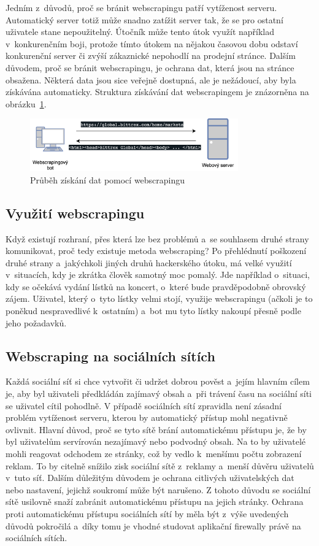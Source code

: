 Jedním z~důvodů, proč se bránit webscrapingu patří vytíženost serveru. Automatický server totiž může snadno zatížit server tak, že se pro ostatní uživatele stane nepoužitelný. Útočník může tento útok využít například v~konkurenčním boji, protože tímto útokem na nějakou časovou dobu odstaví konkurenční server či zvýší zákaznické nepohodlí na prodejní stránce. Dalším důvodem, proč se bránit webscrapingu, je ochrana dat, která jsou na stránce obsažena. Některá data jsou sice veřejně dostupná, ale je nežádoucí, aby byla získávána automaticky. Struktura získávání dat webscrapingem je znázorněna na obrázku~\ref{img:webscraping}.

\begin{figure}[hbt]
	\centering
	\includegraphics[width=0.8\textwidth]{images/webscraping.png}
	\caption{Průběh získání dat pomocí webscrapingu}
	\label{img:webscraping}
\end{figure}

\subsection*{Využití webscrapingu}
Když existují rozhraní, přes která lze bez problémů a~se souhlasem druhé strany komunikovat, proč tedy existuje metoda webscraping? Po přehlédnutí poškození druhé strany a~jakýchkoli jiných druhů hackerského útoku, má velké využití v~situacích, kdy je zkrátka člověk samotný moc pomalý. Jde například o~situaci, kdy se očekává vydání lístků na koncert, o~které bude pravděpodobně obrovský zájem. Uživatel, který o~tyto lístky velmi stojí, využije webscrapingu (ačkoli je to poněkud nespravedlivé k~ostatním) a~bot mu tyto lístky nakoupí přesně podle jeho požadavků.

\subsection*{Webscraping na sociálních sítích}
Každá sociální síť si chce vytvořit či udržet dobrou pověst a~jejím hlavním cílem je, aby byl uživateli předkládán zajímavý obsah a~při trávení času na sociální síti se uživatel cítil pohodlně. V případě sociálních sítí zpravidla není zásadní problém vytíženost serveru, kterou by automatický přístup mohl negativně ovlivnit. Hlavní důvod, proč se tyto sítě brání automatickému přístupu je, že by byl uživatelům servírován nezajímavý nebo podvodný obsah. Na to by uživatelé mohli reagovat odchodem ze stránky, což by vedlo k~menšímu počtu zobrazení reklam. To by citelně snížilo zisk sociální sítě z~reklamy a~menší důvěru uživatelů v~tuto síť. Dalším důležitým důvodem je ochrana citlivých uživatelských dat nebo nastavení, jejichž soukromí může být narušeno. Z tohoto důvodu se sociální sítě usilovně snaží zabránit automatickému přístupu na jejich stránky. Ochrana proti automatickému přístupu sociálních sítí by měla být z~výše uvedených důvodů pokročilá a~díky tomu je vhodné studovat aplikační firewally právě na sociálních sítích.

